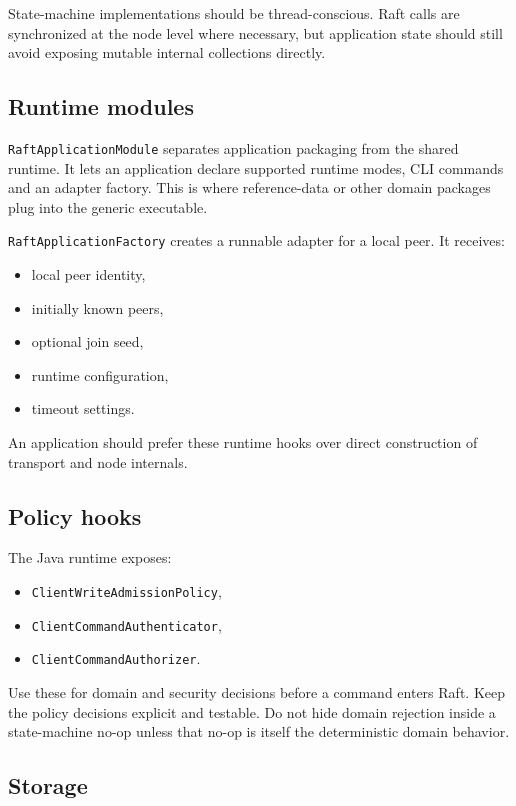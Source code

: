 State-machine implementations should be thread-conscious. Raft calls are
synchronized at the node level where necessary, but application state should
still avoid exposing mutable internal collections directly.

\subsection{Runtime modules}

\texttt{RaftApplicationModule} separates application packaging from the shared
runtime. It lets an application declare supported runtime modes, CLI commands
and an adapter factory. This is where reference-data or other domain packages
plug into the generic executable.

\texttt{RaftApplicationFactory} creates a runnable adapter for a local peer. It
receives:

\begin{itemize}
\item local peer identity,
\item initially known peers,
\item optional join seed,
\item runtime configuration,
\item timeout settings.
\end{itemize}

An application should prefer these runtime hooks over direct construction of
transport and node internals.

\subsection{Policy hooks}

The Java runtime exposes:

\begin{itemize}
\item \texttt{ClientWriteAdmissionPolicy},
\item \texttt{ClientCommandAuthenticator},
\item \texttt{ClientCommandAuthorizer}.
\end{itemize}

Use these for domain and security decisions before a command enters Raft. Keep
the policy decisions explicit and testable. Do not hide domain rejection inside a
state-machine no-op unless that no-op is itself the deterministic domain
behavior.

\subsection{Storage}

